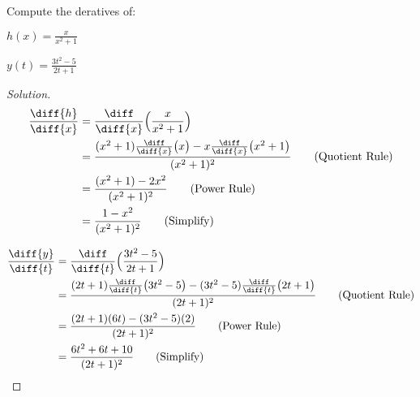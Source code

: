 \documentclass[crop=false,class=article,oneside]{standalone}
\begin{document}
            \begin{problem}
                Compute the deratives of:
                \begin{enumerate}[label=(\alph*)]
                    \begin{multicols}{2}
                        \item $h(x)=\frac{x}{x^{2}+1}$
                        \item $y(t)=\frac{3t^{2}-5}{2t+1}$
                    \end{multicols}
                \end{enumerate}
            \end{problem}
            \begin{proof}[Solution]
                \par\hfill\par
                \begin{minipage}[b]{.49\textwidth}
                    \centering
                    \begin{align*}
                        \frac{\diff{h}}{\diff{x}}
                        &=\frac{\diff}{\diff{x}}
                            \Big(\frac{x}{x^{2}+1}\Big)\\
                        &=\frac{(x^{2}+1)\frac{\diff}{\diff{x}}
                            \big(x\big)-x\frac{\diff}{\diff{x}}
                            \big(x^{2}+1\big)}
                              {(x^{2}+1)^{2}}
                            \tag{Quotient Rule}\\
                        &=\frac{(x^{2}+1)-2x^{2}}{(x^{2}+1)^{2}}
                            \tag{Power Rule}\\
                        &=\frac{1-x^{2}}{(x^{2}+1)^{2}}
                            \tag{Simplify}
                    \end{align*}
                \end{minipage}
                \hfill
                \vline
                \begin{minipage}[b]{.49\textwidth}
                    \centering
                    \begin{align*}
                        \frac{\diff{y}}{\diff{t}}
                        &=\frac{\diff}{\diff{t}}
                            \Big(\frac{3t^{2}-5}{2t+1}\Big)\\
                        &=\frac{(2t+1)\frac{\diff}{\diff{t}}
                                \big(3t^{2}-5\big)-(3t^{2}-5)
                                \frac{\diff}{\diff{t}}\big(2t+1\big)}
                               {{(2t+1)^{2}}}
                                \tag{Quotient Rule}\\
                        &=\frac{(2t+1)(6t)-(3t^{2}-5)(2)}
                               {(2t+1)^{2}}
                            \tag{Power Rule}\\
                        &=\frac{6t^{2}+6t+10}{(2t+1)^{2}}
                            \tag{Simplify}
                    \end{align*}
                \end{minipage}
            \end{proof}
\end{document}
